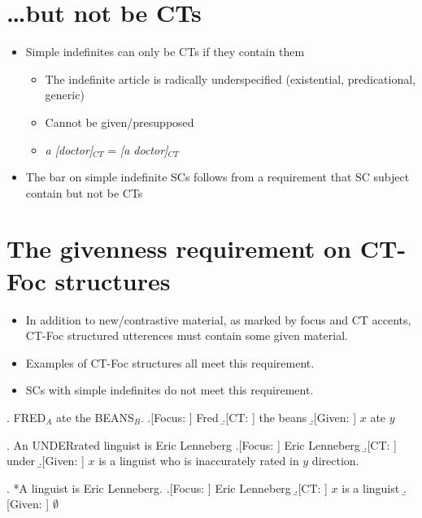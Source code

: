 \documentclass[GPFinal]{subfiles}
\begin{document}
\section{\ldots but not be CTs}
\begin{itemize}
	\item Simple indefinites can only be CTs if they contain them 
		\begin{itemize}
			\item The indefinite article is radically underspecified (existential, predicational, generic)
			\item Cannot be given/presupposed
			\item \textit{a [doctor]}$_{CT}$ = \textit{[a doctor]}$_{CT}$
		\end{itemize}
	\item The bar on simple indefinite SCs follows from a requirement that SC subject contain but not be CTs
\end{itemize}
\section{The givenness requirement on CT-Foc structures}
\begin{itemize}
  \item In addition to new/contrastive material, as marked by focus and CT accents, CT-Foc structured utterences must contain some given material.
  \item Examples of CT-Foc structures all meet this requirement.
  \item SCs with simple indefinites do not meet this requirement.
\end{itemize}
\ex. FRED$_A$ ate the BEANS$_B$.
\a.[Focus: ] Fred
\b.[CT: ] the beans
\b.[Given: ] $x$ ate $y$

\ex. An UNDERrated linguist is Eric Lenneberg
\a.[Focus: ] Eric Lenneberg
\b.[CT: ] under
\b.[Given: ] $x$ is a linguist who is inaccurately rated in $y$ direction.

\ex. *A linguist is Eric Lenneberg.
\a.[Focus: ] Eric Lenneberg
\b.[CT: ] $x$ is a linguist
\b.[Given: ] $\emptyset$
\end{document}
